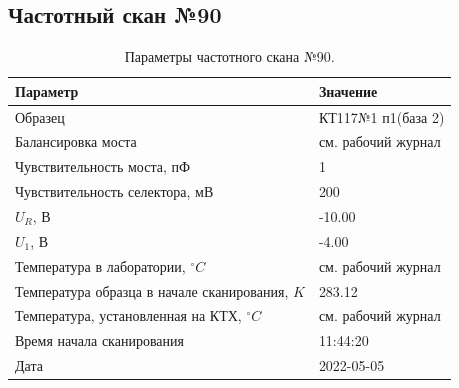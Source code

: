\subsection{Частотный скан №90}
\begin{table}[!ht]
    \centering
    \caption{Параметры частотного скана №90.}
    \begin{tabular}{|l|l|}
        \hline
        Параметр                                       & Значение                  \\ \hline
        Образец                                        & КТ117№1 п1(база 2)        \\ \hline
        Балансировка моста                             & см. рабочий журнал        \\ \hline
        Чувствительность моста, пФ                     & 1                         \\ \hline
        Чувствительность селектора, мВ                 & 200                       \\ \hline
        $U_R$, В                                       & -10.00                    \\ \hline
        $U_1$, В                                       & -4.00                     \\ \hline
        Температура в лаборатории, $^\circ C$          & см. рабочий журнал        \\ \hline
        Температура образца в начале сканирования, $K$ & 283.12                    \\ \hline
        Температура, установленная на КТХ, $^\circ C$  & см. рабочий журнал        \\ \hline
        Время начала сканирования                      & 11:44:20                  \\ \hline
        Дата                                           & 2022-05-05                \\ \hline
    \end{tabular}
    \label{table:frequency_scan_90}
\end{table}

